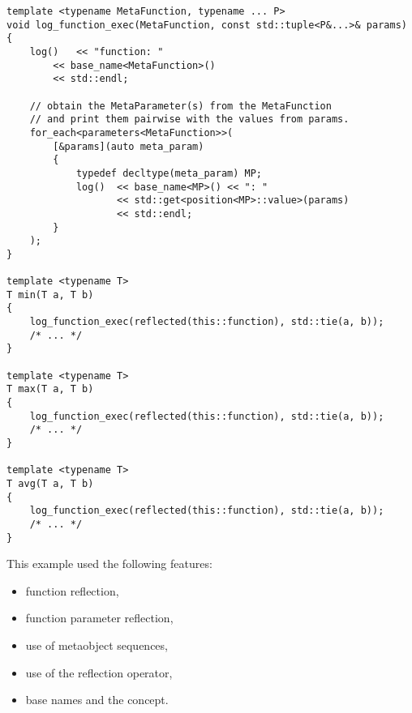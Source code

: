 \begin{verbatim}
template <typename MetaFunction, typename ... P>
void log_function_exec(MetaFunction, const std::tuple<P&...>& params)
{
	log()   << "function: "
		<< base_name<MetaFunction>()
		<< std::endl;

	// obtain the MetaParameter(s) from the MetaFunction
	// and print them pairwise with the values from params.
	for_each<parameters<MetaFunction>>(
		[&params](auto meta_param)
		{
			typedef decltype(meta_param) MP;
			log()  << base_name<MP>() << ": "
			       << std::get<position<MP>::value>(params)
			       << std::endl;
		}
	);
}

template <typename T>
T min(T a, T b)
{
	log_function_exec(reflected(this::function), std::tie(a, b));
	/* ... */
}

template <typename T>
T max(T a, T b)
{
	log_function_exec(reflected(this::function), std::tie(a, b));
	/* ... */
}

template <typename T>
T avg(T a, T b)
{
	log_function_exec(reflected(this::function), std::tie(a, b));
	/* ... */
}
\end{verbatim}

This example used the following features:

\begin{itemize}
\item{function reflection,}
\item{function parameter reflection,}
\item{use of metaobject sequences,}
\item{use of the reflection operator,}
\item{base names and the  concept.}
\end{itemize}

